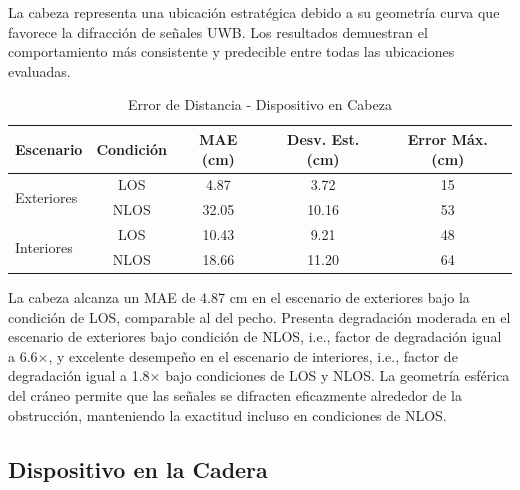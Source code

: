 La cabeza representa una ubicación estratégica debido a su geometría curva que favorece la difracción de señales UWB. Los resultados demuestran el comportamiento más consistente y predecible entre todas las ubicaciones evaluadas.
%
\begin{table}[t]
\centering
\caption{Error de Distancia - Dispositivo en Cabeza}
\label{tab:error_cabeza}
\begin{tabular}{lcccc}
\rowcolor{headerblue}
\toprule
\textbf{Escenario} & \textbf{Condición} & \textbf{MAE (cm)} & \textbf{Desv. Est. (cm)} & \textbf{Error Máx. (cm)} \\
\midrule
\multirow{2}{*}{Exteriores} & LOS  & 4.87  & 3.72  & 15 \\
                          & NLOS & 32.05 & 10.16 & 53 \\
\midrule
\multirow{2}{*}{Interiores} & LOS  & 10.43 & 9.21  & 48 \\
                          & NLOS & 18.66 & 11.20 & 64 \\
\bottomrule
\end{tabular}
\end{table}
%
La cabeza alcanza un MAE de 4.87 cm en el escenario de exteriores bajo la condición de LOS, comparable al del pecho. Presenta degradación moderada en el escenario de exteriores bajo condición de NLOS, i.e., factor de degradación igual a 6.6×, y excelente desempeño en el escenario de interiores, i.e., factor de degradación igual a 1.8× bajo condiciones de LOS y NLOS. La geometría esférica del cráneo permite que las señales se difracten eficazmente alrededor de la obstrucción, manteniendo la exactitud incluso en condiciones de NLOS.

\subsection{Dispositivo en la Cadera}


